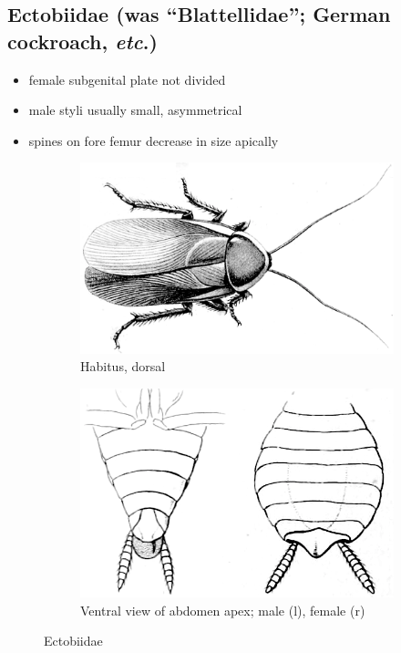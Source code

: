 \documentclass[letterpaper, 11pt]{article}
\begin{document}
\subsection{Ectobiidae (was ``Blattellidae''; German cockroach, \textit{etc}.)}
\begin{itemize}
\item female subgenital plate not divided
\item male styli usually small, asymmetrical
\item spines on fore femur decrease in size apically
\end{itemize}

\begin{figure}[ht!]
    \centering
    \begin{subfigure}[ht!]{0.45\textwidth}
        \includegraphics[width=\textwidth]{EctobiidHabitus}
        \caption{Habitus, dorsal \citep[][Plate III, Fig. 14A]{bhl26431}}
        \label{fig:ectobiidhabitus}
    \end{subfigure}
    \qquad
    \begin{subfigure}[ht!]{0.45\textwidth}
        \includegraphics[width=\textwidth]{EctobiidAbdomen}
        \caption{Ventral view of abdomen apex; male (l), female (r) \citep[Plate II, Fig. 7E,D']{bhl26431}}
        \label{fig:ectobiidgenit}
    \end{subfigure}
    \caption{Ectobiidae}\label{fig:ectobiidae}
\end{figure}
\end{document}

